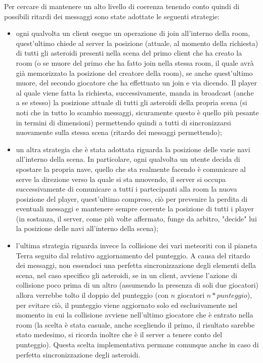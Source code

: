 \documentclass[paper=a4, fontsize=11pt]{scrartcl} %
\numberwithin{equation}{section} %
\numberwithin{figure}{section} %
\numberwithin{table}{section} %
\begin{document}
\begin{itemize}
Per cercare di mantenere un alto livello di coerenza tenendo conto quindi di possibili ritardi dei messaggi sono state adottate le seguenti strategie:
\begin{itemize}
\item ogni qualvolta un client esegue un operazione di join all'interno della room, quest'ultimo chiede al server la posizione (attuale, al momento della richiesta) di tutti gli asteroidi presenti nella scena del primo client che ha creato la room (o se muore del primo che ha fatto join nella stessa room, il quale avrà già memorizzato la posizione del creatore della room), se anche quest'ultimo muore, del secondo giocatore che ha effettuato un join e via dicendo. Il player al quale viene fatta la richiesta, successivamente, manda in broadcast (anche a se stesso) la posizione attuale di tutti gli asteroidi della propria scena (si noti che in tutto lo scambio messaggi, sicuramente questo è quello più pesante in termini di dimensioni) permettendo quindi a tutti di sincronizzarsi nuovamente sulla stessa scena (ritardo dei messaggi permettendo);
\item un altra strategia che è stata adottata riguarda la posizione delle varie navi all'interno della scena. In particolare, ogni qualvolta un utente decida di spostare la propria nave, quello che sta realmente facendo è comunicare al serve la direzione verso la quale si sta muovendo, il server si occupa successivamente di comunicare a tutti i partecipanti alla room la nuova posizione del player, quest'ultimo compreso, ciò per prevenire la perdita di eventuali messaggi e mantenere sempre coerente la posizione di tutti i player (in sostanza, il server, come più volte affermato, funge da arbitro, "decide" lui la posizione delle navi all'interno della scena);
\item l'ultima strategia riguarda invece la collisione dei vari meteoriti con il pianeta Terra seguito dal relativo aggiornamento del punteggio. A causa del ritardo dei messaggi, non essendoci una perfetta sincronizzazione degli elementi della scena, nel caso specifico gli asteroidi, se in un client, avviene l'azione di collisione poco prima di un altro (assumendo la presenza di soli due giocatori) allora verrebbe tolto il doppio del punteggio (con $n$ giocatori $n*punteggio$), per evitare ciò, il punteggio viene aggiornato solo ed esclusivamente nel momento in cui la collisione avviene nell'ultimo giocatore che è entrato nella room (la scelta è stata casuale, anche scegliendo il primo, il risultato sarebbe stato medesimo, si ricorda inoltre che è il server a tenere conto del punteggio). Questa scelta implementativa permane comunque anche in caso di perfetta sincronizzazione degli asteroidi.
\end{itemize}


\end{itemize}
\end{document}
